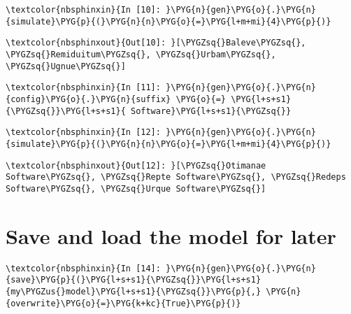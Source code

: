 \documentclass[letterpaper,10pt,english]{sphinxmanual}
\begin{document}
%
\begin{Verbatim}[commandchars=\\\{\}]
\textcolor{nbsphinxin}{In [10]: }\PYG{n}{gen}\PYG{o}{.}\PYG{n}{simulate}\PYG{p}{(}\PYG{n}{n}\PYG{o}{=}\PYG{l+m+mi}{4}\PYG{p}{)}
\end{Verbatim}

%
\begin{Verbatim}[commandchars=\\\{\}]
\textcolor{nbsphinxout}{Out[10]: }[\PYGZsq{}Baleve\PYGZsq{}, \PYGZsq{}Remiduitum\PYGZsq{}, \PYGZsq{}Urbam\PYGZsq{}, \PYGZsq{}Ugnue\PYGZsq{}]
\end{Verbatim}

%
\begin{Verbatim}[commandchars=\\\{\}]
\textcolor{nbsphinxin}{In [11]: }\PYG{n}{gen}\PYG{o}{.}\PYG{n}{config}\PYG{o}{.}\PYG{n}{suffix} \PYG{o}{=} \PYG{l+s+s1}{\PYGZsq{}}\PYG{l+s+s1}{ Software}\PYG{l+s+s1}{\PYGZsq{}}
\end{Verbatim}

%
\begin{Verbatim}[commandchars=\\\{\}]
\textcolor{nbsphinxin}{In [12]: }\PYG{n}{gen}\PYG{o}{.}\PYG{n}{simulate}\PYG{p}{(}\PYG{n}{n}\PYG{o}{=}\PYG{l+m+mi}{4}\PYG{p}{)}
\end{Verbatim}

%
\begin{Verbatim}[commandchars=\\\{\}]
\textcolor{nbsphinxout}{Out[12]: }[\PYGZsq{}Otimanae Software\PYGZsq{}, \PYGZsq{}Repte Software\PYGZsq{}, \PYGZsq{}Redeps Software\PYGZsq{}, \PYGZsq{}Urque Software\PYGZsq{}]
\end{Verbatim}


\section{Save and load the model for later}
\label{\detokenize{notebooks/01_quickstart:Save-and-load-the-model-for-later}}
%
\begin{Verbatim}[commandchars=\\\{\}]
\textcolor{nbsphinxin}{In [14]: }\PYG{n}{gen}\PYG{o}{.}\PYG{n}{save}\PYG{p}{(}\PYG{l+s+s1}{\PYGZsq{}}\PYG{l+s+s1}{my\PYGZus{}model}\PYG{l+s+s1}{\PYGZsq{}}\PYG{p}{,} \PYG{n}{overwrite}\PYG{o}{=}\PYG{k+kc}{True}\PYG{p}{)}
\end{Verbatim}
\end{document}
